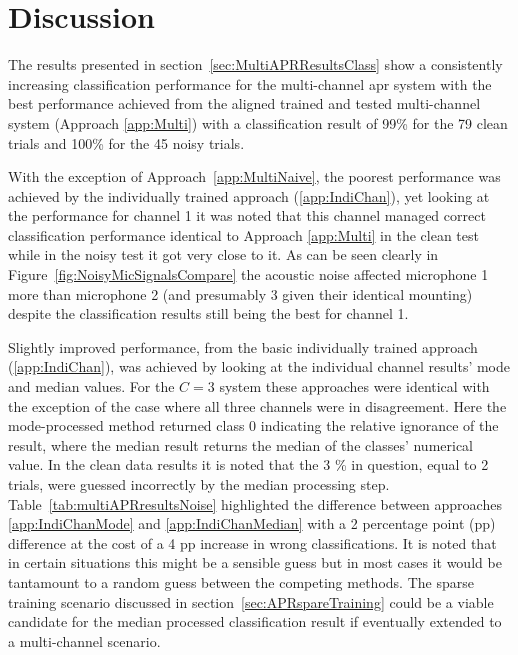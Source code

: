\section{Discussion}
The results presented in section~\ref{sec:MultiAPRResultsClass} show a consistently increasing classification performance for the multi-channel \gls{apr} system with the best performance achieved from the aligned trained and tested multi-channel system (Approach \ref{app:Multi}) with a classification result of 99\% for the 79 clean trials and 100\% for the 45 noisy trials.

With the exception of Approach~\ref{app:MultiNaive}, the poorest performance was achieved by the individually trained approach (\ref{app:IndiChan}), yet looking at the performance for channel 1 it was noted that this channel managed correct classification performance identical to Approach \ref{app:Multi} in the clean test while in the noisy test it got very close to it. As can be seen clearly in Figure~\ref{fig:NoisyMicSignalsCompare} the acoustic noise affected microphone 1 more than microphone 2 (and presumably 3 given their identical mounting) despite the classification results still being the best for channel 1.

Slightly improved performance, from the basic individually trained approach (\ref{app:IndiChan}), was achieved by looking at the individual channel results' mode and median values. For the $C=3$ system these approaches were identical with the exception of the case where all three channels were in disagreement. Here the mode-processed method returned class 0 indicating the relative ignorance of the result, where the median result returns the median of the classes' numerical value. In the clean data results it is noted that the 3 \% in question, equal to 2 trials, were guessed incorrectly by the median processing step. Table~\ref{tab:multiAPRresultsNoise} highlighted the difference between approaches \ref{app:IndiChanMode} and \ref{app:IndiChanMedian} with a 2 percentage point (pp) difference at the cost of a 4 pp increase in wrong classifications. It is noted that in certain situations this might be a sensible guess but in most cases it would be tantamount to a random guess between the competing methods. The sparse training scenario discussed in section~\ref{sec:APRspareTraining} could be a viable candidate for the median processed classification result if eventually extended to a multi-channel scenario.

